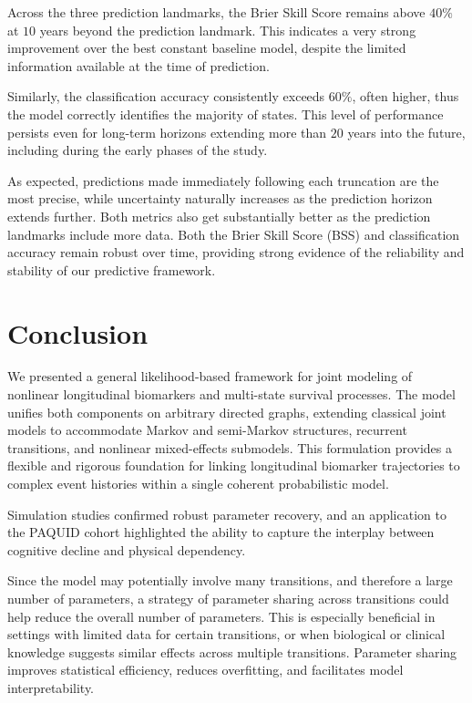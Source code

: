 \documentclass{sn-jnl}
\begin{document}
Across the three prediction landmarks, the Brier Skill Score remains above $40\%$ at $10$ years beyond the prediction landmark. This indicates a very strong improvement over the best constant baseline model, despite the limited information available at the time of prediction.

Similarly, the classification accuracy consistently exceeds $60\%$, often higher, thus the model correctly identifies the majority of states. This level of performance persists even for long-term horizons extending more than $20$ years into the future, including during the early phases of the study.

As expected, predictions made immediately following each truncation are the most precise, while uncertainty naturally increases as the prediction horizon extends further. Both metrics also get substantially better as the prediction landmarks include more data. Both the Brier Skill Score (BSS) and classification accuracy remain robust over time, providing strong evidence of the reliability and stability of our predictive framework.

\section{Conclusion} \label{sec:conclusion}

We presented a general likelihood-based framework for joint modeling of nonlinear longitudinal biomarkers and multi-state survival processes. The model unifies both components on arbitrary directed graphs, extending classical joint models to accommodate Markov and semi-Markov structures, recurrent transitions, and nonlinear mixed-effects submodels. This formulation provides a flexible and rigorous foundation for linking longitudinal biomarker trajectories to complex event histories within a single coherent probabilistic model.

Simulation studies confirmed robust parameter recovery, and an application to the PAQUID cohort highlighted the ability to capture the interplay between cognitive decline and physical dependency.

Since the model may potentially involve many transitions, and therefore a large number of parameters, a strategy of parameter sharing across transitions could help reduce the overall number of parameters. This is especially beneficial in settings with limited data for certain transitions, or when biological or clinical knowledge suggests similar effects across multiple transitions. Parameter sharing improves statistical efficiency, reduces overfitting, and facilitates model interpretability.
\end{document}
